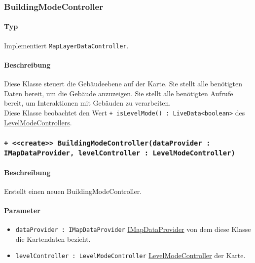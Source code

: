 \subsubsection{BuildingModeController}\label{App_Map_ViewModel_BuildingModeController}
\paragraph*{Typ}
Implementiert \texttt{MapLayerDataController}.
\paragraph*{Beschreibung}
Diese Klasse steuert die Gebäudeebene auf der Karte. Sie stellt alle benötigten Daten bereit, um die Gebäude anzuzeigen. 
Sie stellt alle benötigten Aufrufe bereit, um Interaktionen mit Gebäuden zu verarbeiten.\\
Diese Klasse beobachtet den Wert \texttt{+ isLevelMode() : LiveData<boolean>} des \hyperref[App_Map_ViewModel_LevelModeController]{LevelModeControllers}.

\subsubsection*{\texttt{+ <<create>> BuildingModeController(dataProvider : IMapDataProvider, levelController : LevelModeController)}}%
\paragraph*{Beschreibung}
Erstellt einen neuen BuildingModeController.
\paragraph*{Parameter}
\begin{itemize}
    \item \texttt{dataProvider : IMapDataProvider} \hyperref[App_Map_Model_IMapDataProvider]{IMapDataProvider} von dem diese Klasse die Kartendaten bezieht.
    \item \texttt{levelController : LevelModeController} \hyperref[App_Map_ViewModel_LevelModeController]{LevelModeController} der Karte.
\end{itemize}
